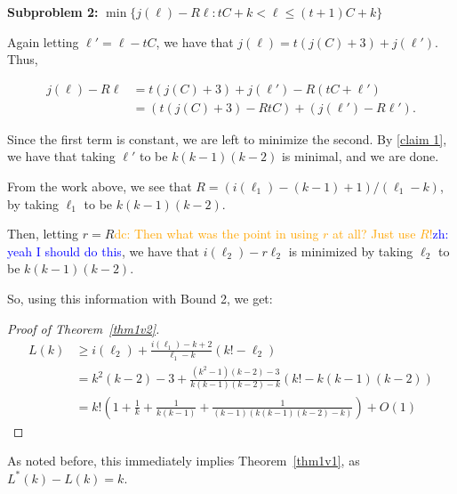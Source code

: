 \documentclass{article}
\theoremstyle{definition}
\newcommand{\hide}[1]{}
\newcommand{\dc}[1]{\textcolor{orange}{dc: #1}}
\newcommand{\zh}[1]{\textcolor{blue}{zh: #1}}
\begin{document}
\vspace{1.75em}
\textbf{Subproblem 2:} $\min \{ j(\ell)-R\ell : tC+k <\ell\leq  (t+1)C+k\}$

Again letting $\ell' = \ell - tC$, we have that $j(\ell) = t(j(C)+3) +j(\ell')$. Thus,

\begin{align*}
    j(\ell)-R\ell &= t(j(C)+3) +j(\ell') - R(tC+\ell')\\
    &= (t(j(C)+3) - RtC) + (j(\ell') - R\ell').
\end{align*} 

 Since the first term is constant, we are left to minimize the second. By \ref{claim 1}, we have that taking $\ell'$ to be $k(k-1)(k-2)$ is minimal, and we are done.

\vspace{1.75em}

From the work above, we see that $R = (i(\ell_1)-(k-1)+1)/(\ell_1-k)$, by taking $\ell_1$ to be $k(k-1)(k-2)$.

Then, letting $r=R$\dc{ Then what was the point in using $r$ at all? Just use $R$!}\zh{ yeah I should do this}, we have that $i(\ell_2)-r\ell_2$ is minimized by taking $\ell_2$ to be $k(k-1)(k-2)$.

So, using this information with Bound 2, we get:

\begin{proof}[Proof of Theorem~\ref*{thm1v2}]
\begin{align*}
    L(k) &\geq i(\ell_2)+\frac{i(\ell_1)-k+2}{\ell_1-k}(k!-\ell_2)\\
    &= k^2(k-2) -3 +\frac{(k^2-1)(k-2)-3}{k(k-1)(k-2)-k}(k!-k(k-1)(k-2))\\
    &= k!\left(1 + \frac{1}{k}+\frac{1}{k(k-1)} + \frac{1}{(k-1)(k(k-1)(k-2)-k)} \right)+ O(1)
\end{align*}\end{proof}
\noindent As noted before, this immediately implies Theorem~\ref{thm1v1}, as $L^*(k)-L(k) = k$.

\hide{*The reason for this is that our bound pretends that in the interval $a_t +k < \ell \leq a_t + k(k-1)(k-2)$, $a_t = t(k(k-1)(k-2)-k)+k$, that we have a fixed initial cost $j(t)$, followed by a path $p_f$ of weight $i(\ell-a_t)$. Here, we find that letting $p_f$ be a 3-cycle is again optimal, which corresponds to letting $\ell$ take the largest value in the interval. The reason for why a 3-cycle is optimal here is roughly that it optimizes $w(p)/|p|$ for $k<|p|\leq k(k-1)(k-2)$, and then by properties of Farey addition, it is the best way to optimize $\frac{j(t)+w(p)}{a_t+|p|}$.\dc{ Literally none of this reasoning makes sense given the machinery and terminology you have established so far. What is $j$? What is a 3-cycle? What is the meaning of ``optimal'' (or it is optimal compared to what)? What do you mean ``roughly''? What is farey (probably should be capitalized) addition? Why are we optimizing that particular quantity?}}
\end{document}
